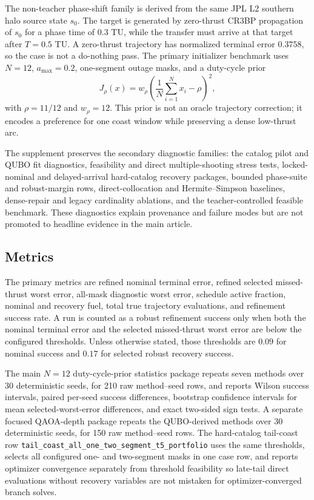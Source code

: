 \documentclass[preprint,12pt]{elsarticle}
\begin{document}
The non-teacher phase-shift family is derived from the same JPL L2 southern halo source state $s_0$. The target is generated by zero-thrust CR3BP propagation of $s_0$ for a phase time of $0.3$ TU, while the transfer must arrive at that target after $T=0.5$ TU. A zero-thrust trajectory has normalized terminal error $0.3758$, so the case is not a do-nothing pass. The primary initializer benchmark uses $N=12$, $a_{\max}=0.2$, one-segment outage masks, and a duty-cycle prior
\begin{equation}
J_{\rho}(x)=w_{\rho}\left(\frac{1}{N}\sum_{i=1}^{N}x_i-\rho\right)^2,
\end{equation}
with $\rho=11/12$ and $w_{\rho}=12$. This prior is not an oracle trajectory correction; it encodes a preference for one coast window while preserving a dense low-thrust arc.

The supplement preserves the secondary diagnostic families: the catalog pilot and QUBO fit diagnostics, feasibility and direct multiple-shooting stress tests, locked-nominal and delayed-arrival hard-catalog recovery packages, bounded phase-suite and robust-margin rows, direct-collocation and Hermite--Simpson baselines, dense-repair and legacy cardinality ablations, and the teacher-controlled feasible benchmark. These diagnostics explain provenance and failure modes but are not promoted to headline evidence in the main article.

\subsection{Metrics}

The primary metrics are refined nominal terminal error, refined selected missed-thrust worst error, all-mask diagnostic worst error, schedule active fraction, nominal and recovery fuel, total true trajectory evaluations, and refinement success rate. A run is counted as a robust refinement success only when both the nominal terminal error and the selected missed-thrust worst error are below the configured thresholds. Unless otherwise stated, those thresholds are $0.09$ for nominal success and $0.17$ for selected robust recovery success.

The main $N=12$ duty-cycle-prior statistics package repeats seven methods over 30 deterministic seeds, for 210 raw method--seed rows, and reports Wilson success intervals, paired per-seed success differences, bootstrap confidence intervals for mean selected-worst-error differences, and exact two-sided sign tests. A separate focused QAOA-depth package repeats the QUBO-derived methods over 30 deterministic seeds, for 150 raw method--seed rows. The hard-catalog tail-coast row \texttt{tail\_coast\_all\_one\_two\_segment\_t5\_portfolio} uses the same thresholds, selects all configured one- and two-segment masks in one case row, and reports optimizer convergence separately from threshold feasibility so late-tail direct evaluations without recovery variables are not mistaken for optimizer-converged branch solves.
\end{document}
